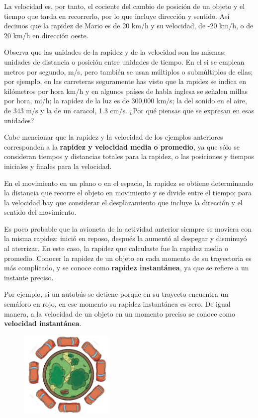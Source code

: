 \documentclass[11pt]{book}
\begin{document}
La velocidad es, por tanto, el cociente del cambio de posición de un objeto y el tiempo que tarda
en recorrerlo, por lo que incluye dirección y sentido. Así decimos que la rapidez de Mario es de
20 km/h y su velocidad, de -20 km/h, o de 20 km/h en dirección oeste.

Observa que las unidades de la rapidez y de la velocidad son las mismas: unidades de distancia
o posición entre unidades de tiempo. En el si se emplean metros por segundo, m/s, pero
también se usan múltiplos o submúltiplos de ellas; por ejemplo, en las carreteras seguramente
has visto que la rapidez se indica en kilómetros por hora km/h y en algunos países de habla
inglesa se señalen millas por hora, mi/h; la rapidez de la luz es de 300,000 km/s;
la del sonido en el aire, de 343 m/s y la de un caracol, 1.3 cm/s. ¿Por qué piensas que
se expresan en esas unidades?

Cabe mencionar que la rapidez y la velocidad de los ejemplos anteriores corresponden a la
\textbf{rapidez y velocidad media o promedio}, ya que sólo se consideran tiempos y distancias totales
para la rapidez, o las posiciones y tiempos iniciales y finales para la velocidad.

En el movimiento en un plano o en el espacio, la rapidez se obtiene determinando la distancia
que recorre el objeto en movimiento y se divide entre el tiempo; para la velocidad hay que
considerar el desplazamiento que incluye la dirección y el sentido del movimiento.

Es poco probable que la avioneta de la actividad anterior siempre se moviera con la misma
rapidez: inició en reposo, después la aumentó al despegar y disminuyó al aterrizar.
En este caso, la rapidez que calculaste fue la rapidez media o promedio. Conocer la rapidez
de un objeto en cada momento de su trayectoria es más complicado, y se conoce como \textbf{rapidez
    instantánea}, ya que se refiere a un instante preciso.

Por ejemplo, si un autobús se detiene porque en su trayecto encuentra un semáforo en rojo,
en ese momento su rapidez instantánea es cero. De igual manera, a la velocidad de un objeto
en un momento preciso se conoce como \textbf{velocidad instantánea}.

\begin{figure}[H]
    \centering
    \includegraphics[width=0.4\textwidth]{glorieta.jpg}
    \label{fig:glorieta}
\end{figure}
\end{document}
